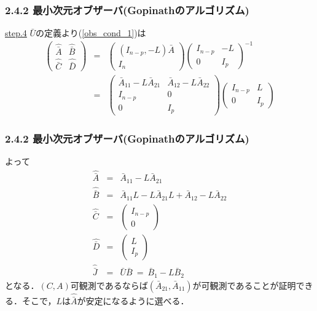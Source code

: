 \begin{frame}[t]
\frametitle{2.4.2 最小次元オブザーバ(Gopinathのアルゴリズム)}
\noindent \underline{step.4}
$\bar{U}$の定義より(\ref{obs_cond_1})は
\begin{eqnarray}
   \left(\begin{array}{cc}
	\hat{\bar{A}} & \hat{\bar{B}} \\
	\hat{\bar{C}} & \hat{\bar{D}}
   \end{array}\right)
   & = & 	   \left(\begin{array}{c}
		( I_{n-p}, -L) \bar{A} \\
		I_{n}
	   \end{array}\right)
	   \left(\begin{array}{cc}
		I_{n-p} & -L \\
		0 &  I_{p} 
	   \end{array}\right) ^{-1}
\nonumber \\
   & = &    \left(\begin{array}{c|c}
		\bar{A}_{11} - L \bar{A}_{21} &
			\bar{A}_{12} - L \bar{A}_{22} \\
		\hline
		I_{n-p}  & 0 \\
		0        & I_{p}
	   \end{array}\right)
	   \left(\begin{array}{cc}
		I_{n-p} & L \\
		0 &  I_{p} 
	   \end{array}\right) 
\end{eqnarray}
\end{frame}

\begin{frame}[t]
\frametitle{2.4.2 最小次元オブザーバ(Gopinathのアルゴリズム)}
よって
\begin{eqnarray}
   \hat{\bar{A}} & = & \bar{A}_{11} - L \bar{A}_{21}
\label{temp12}
\\
   \hat{\bar{B}} & = & \bar{A}_{11} L - L \bar{A}_{21} L 
				+ \bar{A}_{12} - L \bar{A}_{22}
\\
   \hat{\bar{C}} & = & \left(\begin{array}{c}
				I_{n-p} \\
				0 
			\end{array}\right)
\\
   \hat{\bar{D}} & = & \left(\begin{array}{c}
				L  \\
				I_{p} 
			\end{array}\right)
\\
   \hat{\bar{J}} & = & \bar{U} \bar{B}
		 \ = \ \bar{B}_1 - L \bar{B}_2
\end{eqnarray}
となる．$(C,A)$可観測であるならば$(\bar{A}_{21},\bar{A}_{11})$が可観測であることが証明できる．そこで，$L$は$\hat{\bar{A}}$が安定になるように選べる．

\end{frame}

